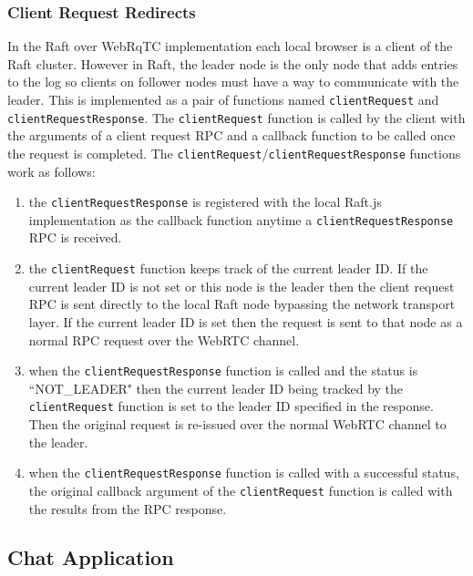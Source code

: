 \documentclass[9pt]{extarticle}
\begin{document}
\begin{multicols}{2}
\subsubsection{Client Request Redirects}


In the Raft over WebRqTC implementation each local browser is a client
of the Raft cluster. However in Raft, the leader node is the only node
that adds entries to the log so clients on follower nodes must have
a way to communicate with the leader. This is implemented as a pair of
functions named \texttt{clientRequest} and
\texttt{clientRequestResponse}. The \texttt{clientRequest} function is
called by the client with the arguments of a client request RPC and
a callback function to be called once the request is completed. The
\texttt{clientRequest}/\texttt{clientRequestResponse} functions work
as follows:

\begin{enumerate}
\item the \texttt{clientRequestResponse} is registered with the local
    Raft.js implementation as the callback function anytime
    a \texttt{clientRequestResponse} RPC is received.
\item the \texttt{clientRequest} function keeps track of the current
    leader ID.  If the current leader ID is not set or this node is
    the leader then the client request RPC is sent directly to the
    local Raft node bypassing the network transport layer.  If the
    current leader ID is set then the request is sent to that node as
    a normal RPC request over the WebRTC channel.
\item when the \texttt{clientRequestResponse} function is called and
    the status is ``NOT\_LEADER" then the current leader ID being
    tracked by the \texttt{clientRequest} function is set to the
    leader ID specified in the response. Then the original request is
    re-issued over the normal WebRTC channel to the leader.
\item when the \texttt{clientRequestResponse} function is called with
    a successful status, the original callback argument of the
    \texttt{clientRequest} function is called with the results from
    the RPC response.
\end{enumerate}

\subsection{Chat Application}


\end{multicols}
\end{document}
